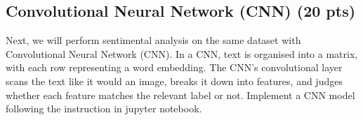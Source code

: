 \documentclass{assignment format}
\begin{document}
\subsection{Convolutional Neural Network (CNN) (20 pts)}
Next, we will perform sentimental analysis on the same dataset with Convolutional Neural Network (CNN). In a CNN, text is organised into a matrix, with each row representing a word embedding. The CNN’s convolutional layer scans the text like it would an image, breaks it down into features, and judges whether each feature matches the relevant label or not. Implement a CNN model following the instruction in jupyter notebook.
\end{document}
